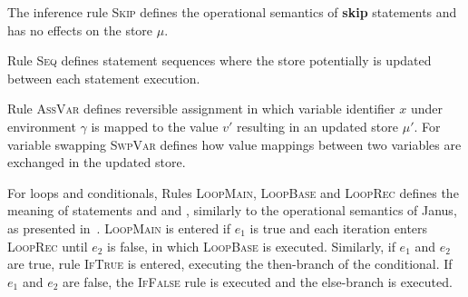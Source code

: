 
The inference rule \textsc{Skip} defines the operational semantics of \textbf{skip} statements and has no effects on the store $\mu$.

Rule \textsc{Seq} defines statement sequences where the store potentially is updated between each statement execution. 

Rule \textsc{AssVar} defines reversible assignment in which variable identifier $x$ under environment $\gamma$ is mapped to the value $v'$ resulting in an updated store $\mu'$. For variable swapping \textsc{SwpVar} defines how value mappings between two variables are exchanged in the updated store.

For loops and conditionals, Rules \textsc{LoopMain}, \textsc{LoopBase} and \textsc{LoopRec} defines the meaning of  statements and  and , similarly to the operational semantics of Janus, as presented in~\cite{ty:ejanus}. \textsc{LoopMain} is entered if $e_1$ is true and each iteration enters \textsc{LoopRec} until $e_2$ is false, in which \textsc{LoopBase} is executed. Similarly, if $e_1$ and $e_2$ are true, rule \textsc{IfTrue} is entered, executing the then-branch of the conditional. If $e_1$ and $e_2$ are false, the \textsc{IfFalse} rule is executed and the else-branch is executed.

